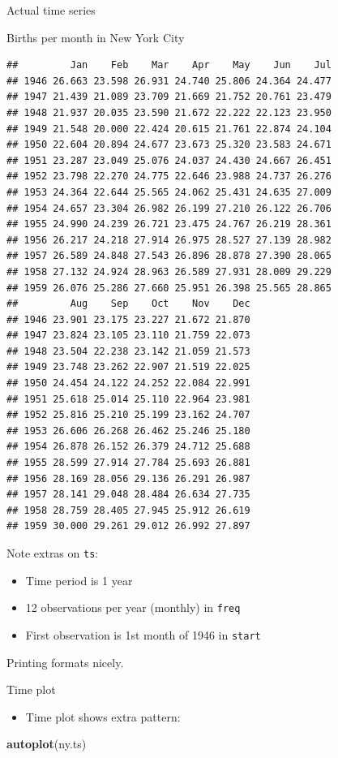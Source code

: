\documentclass[ignorenonframetext,]{beamer}
\newenvironment{Shaded}{\begin{snugshade}}{\end{snugshade}}
\newcommand{\KeywordTok}[1]{\textcolor[rgb]{0.13,0.29,0.53}{\textbf{#1}}}
\newcommand{\NormalTok}[1]{#1}
\providecommand{\tightlist}{%
  \setlength{\itemsep}{0pt}\setlength{\parskip}{0pt}}
\begin{document}
\begin{frame}[fragile]{Actual time series}
\begin{block}{Births per month in New York City}
\begin{verbatim}
##         Jan    Feb    Mar    Apr    May    Jun    Jul
## 1946 26.663 23.598 26.931 24.740 25.806 24.364 24.477
## 1947 21.439 21.089 23.709 21.669 21.752 20.761 23.479
## 1948 21.937 20.035 23.590 21.672 22.222 22.123 23.950
## 1949 21.548 20.000 22.424 20.615 21.761 22.874 24.104
## 1950 22.604 20.894 24.677 23.673 25.320 23.583 24.671
## 1951 23.287 23.049 25.076 24.037 24.430 24.667 26.451
## 1952 23.798 22.270 24.775 22.646 23.988 24.737 26.276
## 1953 24.364 22.644 25.565 24.062 25.431 24.635 27.009
## 1954 24.657 23.304 26.982 26.199 27.210 26.122 26.706
## 1955 24.990 24.239 26.721 23.475 24.767 26.219 28.361
## 1956 26.217 24.218 27.914 26.975 28.527 27.139 28.982
## 1957 26.589 24.848 27.543 26.896 28.878 27.390 28.065
## 1958 27.132 24.924 28.963 26.589 27.931 28.009 29.229
## 1959 26.076 25.286 27.660 25.951 26.398 25.565 28.865
##         Aug    Sep    Oct    Nov    Dec
## 1946 23.901 23.175 23.227 21.672 21.870
## 1947 23.824 23.105 23.110 21.759 22.073
## 1948 23.504 22.238 23.142 21.059 21.573
## 1949 23.748 23.262 22.907 21.519 22.025
## 1950 24.454 24.122 24.252 22.084 22.991
## 1951 25.618 25.014 25.110 22.964 23.981
## 1952 25.816 25.210 25.199 23.162 24.707
## 1953 26.606 26.268 26.462 25.246 25.180
## 1954 26.878 26.152 26.379 24.712 25.688
## 1955 28.599 27.914 27.784 25.693 26.881
## 1956 28.169 28.056 29.136 26.291 26.987
## 1957 28.141 29.048 28.484 26.634 27.735
## 1958 28.759 28.405 27.945 25.912 26.619
## 1959 30.000 29.261 29.012 26.992 27.897
\end{verbatim}

Note extras on \texttt{ts}:

\begin{itemize}
\tightlist
\item
  Time period is 1 year
\item
  12 observations per year (monthly) in \texttt{freq}
\item
  First observation is 1st month of 1946 in \texttt{start}
\end{itemize}

Printing formats nicely.

Time plot

\begin{itemize}
\tightlist
\item
  Time plot shows extra pattern:
\end{itemize}

\begin{Shaded}
\begin{Highlighting}[]
\KeywordTok{autoplot}\NormalTok{(ny.ts)}
\end{Highlighting}
\end{Shaded}


\end{block}
\end{frame}
\end{document}

